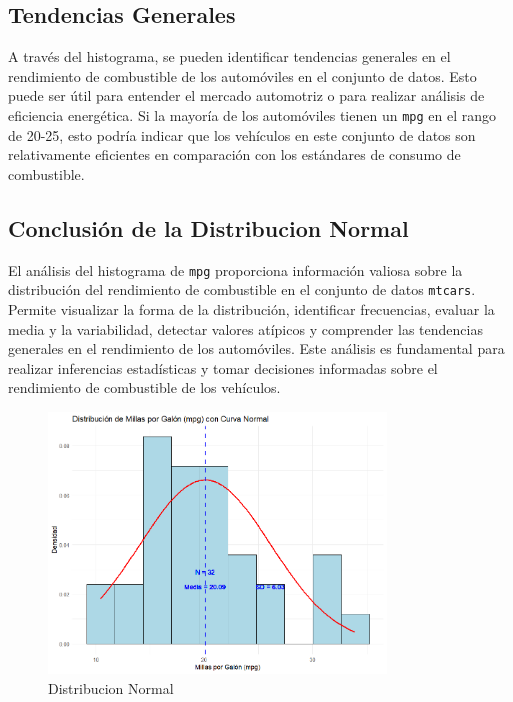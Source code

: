 \documentclass{article}
\begin{document}
\subsection{Tendencias Generales}
A través del histograma, se pueden identificar tendencias generales en el rendimiento de combustible de los automóviles en el conjunto de datos. Esto puede ser útil para entender el mercado automotriz o para realizar análisis de eficiencia energética. Si la mayoría de los automóviles tienen un \texttt{mpg} en el rango de 20-25, esto podría indicar que los vehículos en este conjunto de datos son relativamente eficientes en comparación con los estándares de consumo de combustible.

\subsection{Conclusión de la Distribucion Normal}
El análisis del histograma de \texttt{mpg} proporciona información valiosa sobre la distribución del rendimiento de combustible en el conjunto de datos \texttt{mtcars}. Permite visualizar la forma de la distribución, identificar frecuencias, evaluar la media y la variabilidad, detectar valores atípicos y comprender las tendencias generales en el rendimiento de los automóviles. Este análisis es fundamental para realizar inferencias estadísticas y tomar decisiones informadas sobre el rendimiento de combustible de los vehículos.
\begin{figure}[h] %
	\centering %
	\includegraphics[width=0.8\textwidth]{Image3.png}
	\caption{Distribucion Normal} %
	\label{fig:mi_imagen} %
\end{figure}
\end{document}
